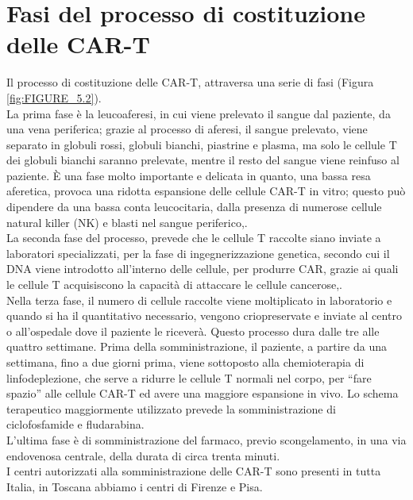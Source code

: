 \section{Fasi del processo di costituzione delle CAR-T}

Il processo di costituzione delle CAR-T, attraversa una serie di fasi (Figura \ref{fig:FIGURE_5.2}).\\
La prima fase è la leucoaferesi, in cui viene prelevato il sangue dal 
paziente, da una vena periferica; grazie al processo di aferesi, il sangue prelevato, viene separato in 
globuli rossi, globuli bianchi, piastrine e plasma, ma solo le cellule T dei globuli bianchi saranno prelevate, 
mentre il resto del sangue viene reinfuso al paziente.
È una fase molto importante e delicata in quanto, una bassa resa aferetica, provoca una 
ridotta espansione delle cellule CAR-T in vitro; questo può dipendere da una bassa conta leucocitaria, 
dalla presenza di numerose cellule natural killer (NK) e blasti nel sangue periferico\cite{EMATOCART},\cite{LLSCART}.\\
La seconda fase del processo, prevede che le cellule T raccolte siano inviate a laboratori specializzati, per la fase 
di ingegnerizzazione genetica, secondo cui il DNA viene introdotto all’interno delle cellule, per produrre CAR, 
grazie ai quali le cellule T acquisiscono la capacità di attaccare le cellule cancerose\cite{EMATOCART},\cite{LLSCART}.\\
Nella terza fase, il numero di cellule raccolte viene moltiplicato in laboratorio e quando si ha il quantitativo 
necessario, vengono criopreservate e inviate al centro o all’ospedale dove il paziente le riceverà. 
Questo processo dura dalle tre alle quattro settimane.
Prima della somministrazione, il paziente, a partire da una settimana, fino a due giorni prima, viene sottoposto 
alla chemioterapia di linfodeplezione, che serve a ridurre le cellule T normali nel corpo, per “fare spazio” alle 
cellule CAR-T ed avere una maggiore espansione in vivo.
Lo schema terapeutico maggiormente utilizzato prevede la somministrazione di ciclofosfamide e fludarabina.\\
L’ultima fase è di somministrazione del farmaco, previo scongelamento, in una via endovenosa centrale, 
della durata di circa trenta minuti\cite{EMATOCART}.\\
I centri autorizzati alla somministrazione delle CAR-T sono presenti in tutta Italia, in Toscana abbiamo 
i centri di Firenze e Pisa\cite{AILCENTRI}.

